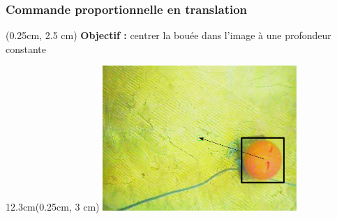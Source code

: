 \documentclass[10pt]{beamer}
\begin{document}
\begin{frame}
\frametitle{Commande proportionnelle en translation}
\begin{textblock*}{12.3cm}(0.25cm, 2.5 cm) %
\textbf{Objectif :} centrer la bouée dans l'image à une profondeur constante 
\end{textblock*}
\begin{textblock*} {12.3cm}(0.25cm, 3 cm)
\centering
\includegraphics[height=5.5cm, keepaspectratio]{Pictures/commande_orange_ball.png}
\end{textblock*}
\end{frame}
\end{document}
